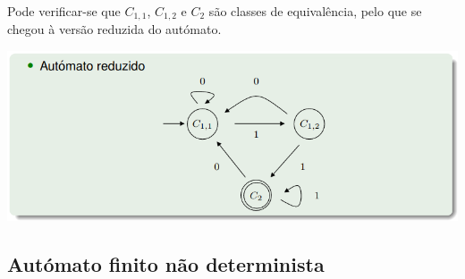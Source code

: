 \documentclass{article}
\begin{document}
\begin{flushleft}
  \pagebreak

  \item Pode verificar-se que $C_{1,1}$, $C_{1,2}$ e $C_2$ são classes de equivalência, pelo que se
  chegou à versão reduzida do autómato.

  \begin{center}
    \includegraphics[scale=0.4]{45}
  \end{center}
\end{flushleft}

\subsection{Autómato finito não determinista}

\vspace{3mm}
\end{document}
